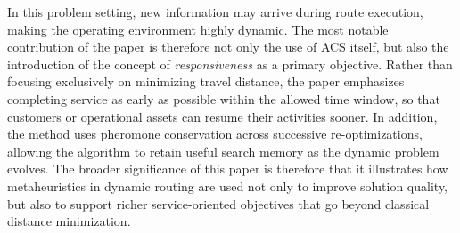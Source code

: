 In this problem setting, new information may arrive during route execution, making the operating environment highly dynamic.
The most notable contribution of the paper is therefore not only the use of ACS itself, but also the introduction of the 
concept of \emph{responsiveness} as a primary objective. Rather than focusing exclusively on minimizing travel distance, 
the paper emphasizes completing service as early as possible within the allowed time window, so that customers or operational 
assets can resume their activities sooner. In addition, the method uses pheromone conservation across successive re-optimizations,
allowing the algorithm to retain useful search memory as the dynamic problem evolves.
The broader significance of this paper is therefore that it illustrates how metaheuristics in dynamic routing are 
used not only to improve solution quality, but also to support richer service-oriented objectives that go beyond 
classical distance minimization.

